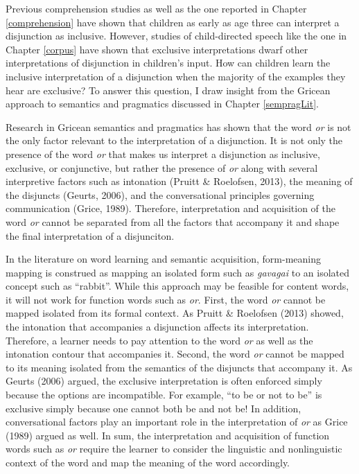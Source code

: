 \documentclass[oneside]{report}
\theoremstyle{definition}
\theoremstyle{definition}
\theoremstyle{definition}
\theoremstyle{remark}
\begin{document}
Previous comprehension studies as well as the one reported in Chapter
\ref{comprehension} have shown that children as early as age three can
interpret a disjunction as inclusive. However, studies of child-directed
speech like the one in Chapter \ref{corpus} have shown that exclusive
interpretations dwarf other interpretations of disjunction in children's
input. How can children learn the inclusive interpretation of a
disjunction when the majority of the examples they hear are exclusive?
To answer this question, I draw insight from the Gricean approach to
semantics and pragmatics discussed in Chapter \ref{sempragLit}.

Research in Gricean semantics and pragmatics has shown that the word
\emph{or} is not the only factor relevant to the interpretation of a
disjunction. It is not only the presence of the word \emph{or} that
makes us interpret a disjunction as inclusive, exclusive, or
conjunctive, but rather the presence of \emph{or} along with several
interpretive factors such as intonation (Pruitt \& Roelofsen, 2013), the
meaning of the disjuncts (Geurts, 2006), and the conversational
principles governing communication (Grice, 1989). Therefore,
interpretation and acquisition of the word \emph{or} cannot be separated
from all the factors that accompany it and shape the final
interpretation of a disjunciton.

In the literature on word learning and semantic acquisition,
form-meaning mapping is construed as mapping an isolated form such as
\emph{gavagai} to an isolated concept such as ``rabbit''. While this
approach may be feasible for content words, it will not work for
function words such as \emph{or}. First, the word \emph{or} cannot be
mapped isolated from its formal context. As Pruitt \& Roelofsen (2013)
showed, the intonation that accompanies a disjunction affects its
interpretation. Therefore, a learner needs to pay attention to the word
\emph{or} as well as the intonation contour that accompanies it. Second,
the word \emph{or} cannot be mapped to its meaning isolated from the
semantics of the disjuncts that accompany it. As Geurts (2006) argued,
the exclusive interpretation is often enforced simply because the
options are incompatible. For example, ``to be or not to be'' is
exclusive simply because one cannot both be and not be! In addition,
conversational factors play an important role in the interpretation of
\emph{or} as Grice (1989) argued as well. In sum, the interpretation and
acquisition of function words such as \emph{or} require the learner to
consider the linguistic and nonlinguistic context of the word and map
the meaning of the word accordingly.
\end{document}
